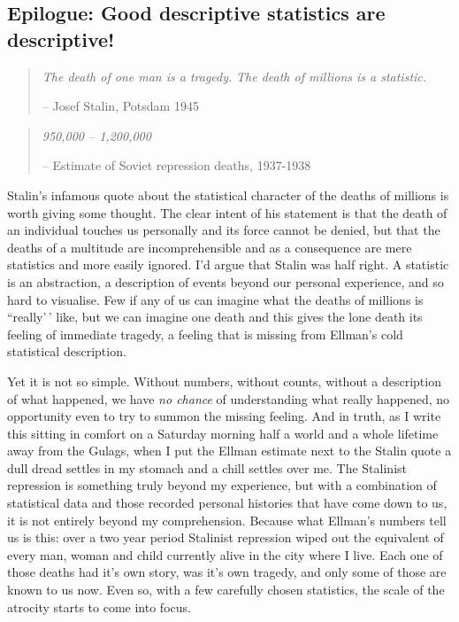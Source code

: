 \documentclass[
]{book}
\begin{document}
\hypertarget{epilogue-good-descriptive-statistics-are-descriptive}{%
\subsection{Epilogue: Good descriptive statistics are descriptive!}\label{epilogue-good-descriptive-statistics-are-descriptive}}

\begin{quote}
\emph{The death of one man is a tragedy.}
\emph{The death of millions is a statistic.}

-- Josef Stalin, Potsdam 1945
\end{quote}

\begin{quote}
\emph{950,000 -- 1,200,000}

-- Estimate of Soviet repression deaths, 1937-1938 \citep{Ellman2002}
\end{quote}

Stalin's infamous quote about the statistical character of the deaths of millions is worth giving some thought. The clear intent of his statement is that the death of an individual touches us personally and its force cannot be denied, but that the deaths of a multitude are incomprehensible and as a consequence are mere statistics and more easily ignored. I'd argue that Stalin was half right. A statistic is an abstraction, a description of events beyond our personal experience, and so hard to visualise. Few if any of us can imagine what the deaths of millions is ``really'\,' like, but we can imagine one death and this gives the lone death its feeling of immediate tragedy, a feeling that is missing from Ellman's cold statistical description.

Yet it is not so simple. Without numbers, without counts, without a description of what happened, we have \emph{no chance} of understanding what really happened, no opportunity even to try to summon the missing feeling. And in truth, as I write this sitting in comfort on a Saturday morning half a world and a whole lifetime away from the Gulags, when I put the Ellman estimate next to the Stalin quote a dull dread settles in my stomach and a chill settles over me. The Stalinist repression is something truly beyond my experience, but with a combination of statistical data and those recorded personal histories that have come down to us, it is not entirely beyond my comprehension. Because what Ellman's numbers tell us is this: over a two year period Stalinist repression wiped out the equivalent of every man, woman and child currently alive in the city where I live. Each one of those deaths had it's own story, was it's own tragedy, and only some of those are known to us now. Even so, with a few carefully chosen statistics, the scale of the atrocity starts to come into focus.
\end{document}
